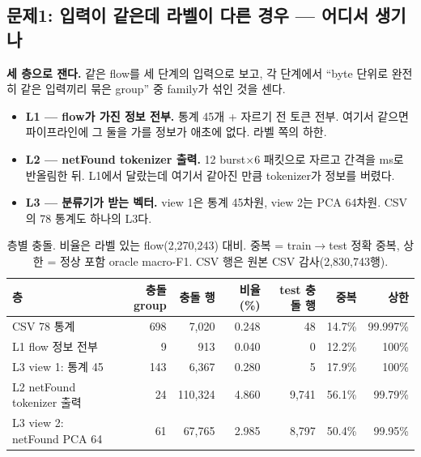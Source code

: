 \subsection{문제1: 입력이 같은데 라벨이 다른 경우 --- 어디서 생기나}
\textbf{세 층으로 잰다.} 같은 flow를 세 단계의 입력으로 보고, 각 단계에서 ``byte 단위로 완전히 같은 입력끼리 묶은 group'' 중 family가 섞인 것을 센다.
\begin{itemize}
\item \textbf{L1 --- flow가 가진 정보 전부.} 통계 45개 + 자르기 전 토큰 전부. 여기서 같으면 파이프라인에 그 둘을 가를 정보가 애초에 없다. 라벨 쪽의 하한.
\item \textbf{L2 --- netFound tokenizer 출력.} 12 burst$\times$6 패킷으로 자르고 간격을 ms로 반올림한 뒤. L1에서 달랐는데 여기서 같아진 만큼 tokenizer가 정보를 버렸다.
\item \textbf{L3 --- 분류기가 받는 벡터.} view 1은 통계 45차원, view 2는 PCA 64차원. CSV의 78 통계도 하나의 L3다.
\end{itemize}

\begin{table}[H]
\centering\small
\caption{층별 충돌. 비율은 라벨 있는 flow(2,270,243) 대비. 중복 = train$\to$test 정확 중복, 상한 = 정상 포함 oracle macro-F1. CSV 행은 원본 CSV 감사(2,830,743행).}
\footnotesize
\begin{tabular}{lrrrrrr}
\toprule 층 & 충돌 group & 충돌 행 & 비율(\%) & test 충돌 행 & 중복 & 상한\\\midrule
CSV 78 통계 & 698 & 7,020 & 0.248 & 48 & 14.7\% & 99.997\%\\
L1 flow 정보 전부 & 9 & 913 & 0.040 & 0 & 12.2\% & 100\%\\
L3 view 1: 통계 45 & 143 & 6,367 & 0.280 & 5 & 17.9\% & 100\%\\
L2 netFound tokenizer 출력 & 24 & 110,324 & 4.860 & 9,741 & 56.1\% & 99.79\%\\
L3 view 2: netFound PCA 64 & 61 & 67,765 & 2.985 & 8,797 & 50.4\% & 99.95\%\\
\bottomrule
\end{tabular}
\end{table}


